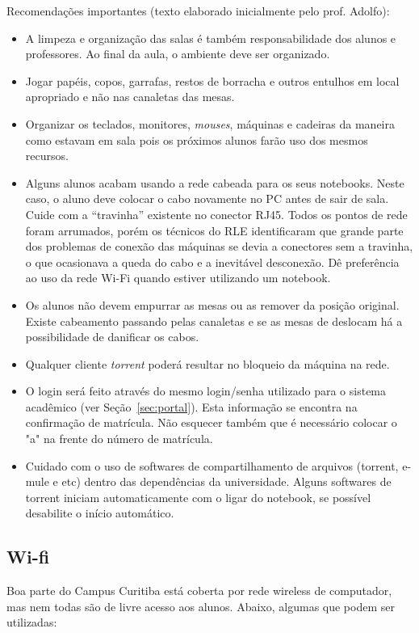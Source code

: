 \documentclass[a4paper,12pt,openany]{article}
\begin{document}
Recomendações importantes (texto elaborado inicialmente pelo prof. Adolfo):
\begin{itemize}
\item A limpeza e organização das salas é também responsabilidade dos alunos e professores. Ao final da aula, o ambiente deve ser organizado.
\item Jogar papéis, copos, garrafas, restos de borracha e outros entulhos em local apropriado e não nas canaletas das mesas.
\item Organizar os teclados, monitores, \textit{mouses}, máquinas e cadeiras da maneira como estavam em sala pois os próximos alunos farão uso dos mesmos recursos.
\item Alguns alunos acabam usando a rede cabeada para os seus notebooks. Neste caso, o aluno deve colocar o cabo novamente no PC antes de sair de sala. Cuide com a ``travinha'' existente no conector RJ45. Todos os pontos de rede foram arrumados, porém os técnicos do RLE identificaram que grande  parte dos problemas de conexão das máquinas se devia a conectores sem a travinha, o que ocasionava a queda do cabo e a inevitável desconexão. Dê preferência ao uso da rede Wi-Fi quando estiver utilizando um notebook.
\item Os alunos não devem empurrar as mesas ou as remover da posição original. Existe cabeamento passando pelas canaletas e se as mesas de deslocam há a possibilidade de danificar os cabos.
\item Qualquer cliente \textit{torrent} poderá resultar no bloqueio da máquina na rede.
\item O login será feito através do mesmo login/senha utilizado para o sistema acadêmico (ver Seção~\ref{sec:portal}). Esta informação se encontra na confirmação de matrícula. Não esquecer também que é necessário colocar o "a" na frente do número de matrícula.
\item Cuidado com o uso de softwares de compartilhamento de arquivos (torrent, e-mule e etc) dentro das dependências da universidade. Alguns softwares de torrent iniciam automaticamente com o ligar do notebook, se possível desabilite o início automático.
\end{itemize}

\subsection{Wi-fi}
Boa parte do Campus Curitiba está coberta por rede wireless de computador, mas nem todas são de livre acesso aos alunos. Abaixo, algumas que podem ser utilizadas:
\end{document}
